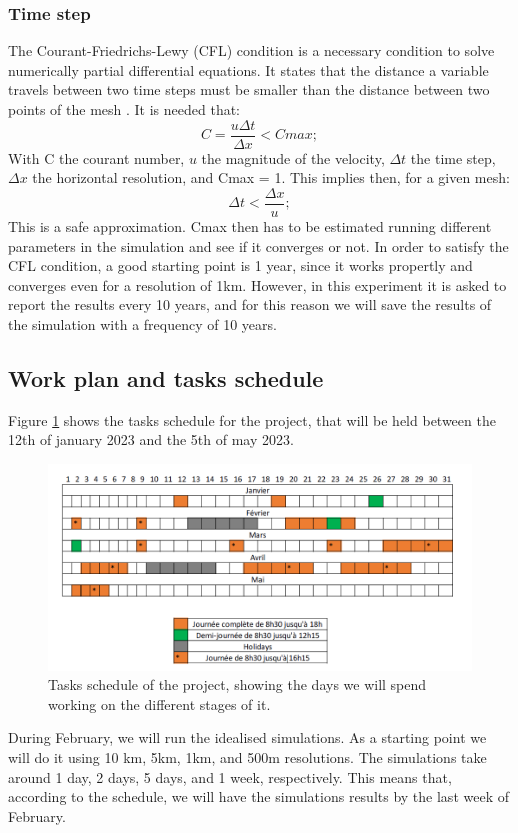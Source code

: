 \documentclass[a4paper,12pt]{article}
\begin{document}
\subsubsection{Time step}
The Courant-Friedrichs-Lewy (CFL) condition is a necessary condition to solve numerically partial differential equations. It states that the distance a variable travels between two time steps must be smaller than the distance between two points of the mesh \cite[]{courant1967partial}. It is needed that:
\begin{equation}
	C=\frac{u\Delta t}{\Delta x}<Cmax;
\end{equation}
With C the courant number, $u$ the magnitude of the velocity, $\Delta t$ the time step, $\Delta x$ the horizontal resolution, and Cmax = 1. This implies then, for a given mesh:
\begin{equation}
	\Delta t < \frac{\Delta x}{u};
\end{equation}
This is a safe approximation. Cmax then has to be estimated running different parameters in the simulation and see if it converges or not. In order to satisfy the CFL condition, a good starting point is 1 year, since it works propertly and converges even for a resolution of 1km.
However, in this experiment it is asked to report the results every 10 years, and for this reason we will save the results of the simulation with a frequency of 10 years. 
\subsection{Work plan and tasks schedule}
Figure \ref{Schedule} shows the tasks schedule for the project, that will be held between the 12th of january 2023 and the 5th of may 2023. 
\begin{figure}[!h]
	\centering
	\includegraphics[width=0.7\linewidth]{../fig/Schedule}
	\caption{Tasks schedule of the project, showing the days we will spend working on the different stages of it.}
	\label{Schedule}
\end{figure}
During February, we will run the idealised simulations. As a starting point we will do it using 10 km, 5km, 1km, and 500m resolutions. The simulations take around 1 day, 2 days, 5 days, and 1 week, respectively. This means that, according to the schedule, we will have the simulations results by the last week of February. 
\end{document}
